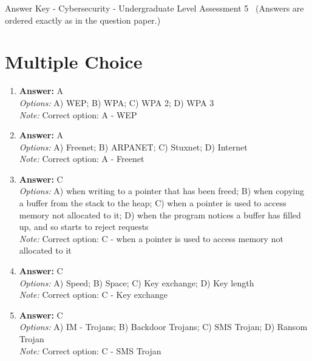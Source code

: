 \documentclass[12pt]{article}
\begin{document}
\begin{center}
Answer Key - Cybersecurity - Undergraduate Level Assessment 5 \
\small (Answers are ordered exactly as in the question paper.)
\end{center}

\section*{Multiple Choice}
\begin{enumerate}[label=\arabic*.]
\item \textbf{Answer:} A
\\ \textit{Options:} A) WEP; B) WPA; C) WPA 2; D) WPA 3
\\ \textit{Note:} Correct option: A - WEP
\item \textbf{Answer:} A
\\ \textit{Options:} A) Freenet; B) ARPANET; C) Stuxnet; D) Internet
\\ \textit{Note:} Correct option: A - Freenet
\item \textbf{Answer:} C
\\ \textit{Options:} A) when writing to a pointer that has been freed; B) when copying a buffer from the stack to the heap; C) when a pointer is used to access memory not allocated to it; D) when the program notices a buffer has filled up, and so starts to reject requests
\\ \textit{Note:} Correct option: C - when a pointer is used to access memory not allocated to it
\item \textbf{Answer:} C
\\ \textit{Options:} A) Speed; B) Space; C) Key exchange; D) Key length
\\ \textit{Note:} Correct option: C - Key exchange
\item \textbf{Answer:} C
\\ \textit{Options:} A) IM - Trojans; B) Backdoor Trojans; C) SMS Trojan; D) Ransom Trojan
\\ \textit{Note:} Correct option: C - SMS Trojan
\end{enumerate}
\end{document}
